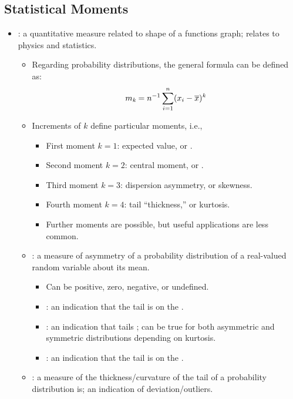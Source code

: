 \begin{itemize}
  \subsection{Statistical Moments}
  \begin{itemize}
    \item {}: a quantitative measure related to shape of a functions graph; relates to physics and statistics.
      \begin{itemize}
        \item Regarding probability distributions, the general formula can be defined as:
        \[%
        m_\emph{k} = n ^{-1} \sum_{i = 1}^{n}(x_i - \overline{x})^\emph{k}
        \]%
        \item Increments of \(k\) define particular moments, i.e.,
          \begin{itemize}
            \item First moment \(k=1\): expected value, or \hyperref[Subsection: Measures of Central Tendency]{}.
            \item Second moment \(k=2\): central moment, or \hyperref[Subsection: Measures of Dispersion]{}.
            \item Third moment \(k=3\): dispersion asymmetry, or skewness.
            \item Fourth moment \(k=4\): tail ``thickness,'' or kurtosis.
            \item Further moments are possible, but useful applications are less common.
          \end{itemize}
        \item {}: a measure of asymmetry of a probability distribution of a real-valued random variable about its mean.
          \begin{itemize}
            \item Can be positive, zero, negative, or undefined.
            \item {}: an indication that the tail is on the .
            \item {}: an indication that tails ; can be true for both asymmetric and symmetric distributions depending on kurtosis.
            \item {}: an indication that the tail is on the . 
          \end{itemize}
        \item {}: a measure of the thickness/curvature of the tail of a probability distribution is; an indication of deviation/outliers.

\end{itemize}
\end{itemize}
\end{itemize}
